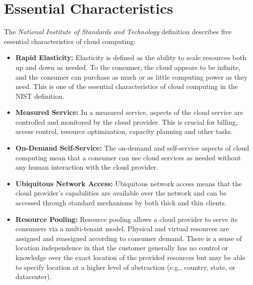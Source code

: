 \section{Essential Characteristics}
The \emph{National Institute of Standards and Technology} definition describes five essential characteristics of cloud computing:
\begin{itemize}
 \item {\bf Rapid Elasticity:} Elasticity is defined as the ability to scale resources both up and down as needed. To the consumer, 
       the cloud appears to be infinite, and the consumer can purchase as much or as little computing power as they need. This is one 
       of the essential characteristics of cloud computing in the NIST definition.
 \item {\bf Measured Service:} In a measured service, aspects of the cloud service are controlled and monitored by the cloud provider.
       This is crucial for billing, access control, resource optimization, capacity planning and other tasks. 
 \item {\bf On-Demand Self-Service:} The on-demand and self-service aspects of cloud computing mean that a consumer can use cloud 
       services as needed without any human interaction with the cloud provider. 
 \item {\bf Ubiquitous Network Access:} Ubiquitous network access means that the cloud provider’s capabilities are available over 
       the network and can be accessed through standard mechanisms by both thick and thin clients.
 \item {\bf Resource Pooling:} Resource pooling allows a  cloud provider to serve its consumers via a multi-tenant model. Physical 
       and virtual resources are assigned and reassigned according to consumer demand. There is a sense of location independence 
       in that the customer generally has no control or knowledge over the exact location of the provided resources but may be 
       able to specify location at a higher level of abstraction (e.g., country, state, or datacenter).
\end{itemize}
